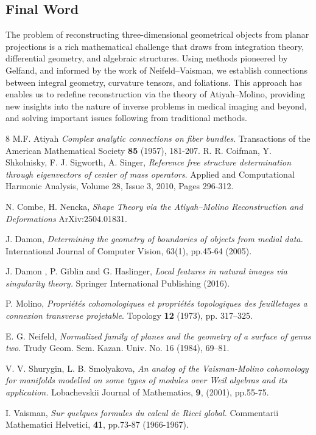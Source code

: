 \documentclass[runningheads]{llncs}
\begin{document}
\subsection{Final Word}
The problem of reconstructing three-dimensional geometrical objects from planar projections is a rich mathematical challenge that draws from integration theory, differential geometry, and algebraic structures. Using methods pioneered by Gelfand, and informed by the work of Neifeld--Vaisman, we establish connections between integral geometry, curvature tensors, and foliations. This approach has enables us to redefine reconstruction via the theory of Atiyah--Molino, providing new insights into the nature of inverse problems in medical imaging and beyond, and solving important issues following from traditional methods.   


%

{\small \begin{thebibliography}{8}
 M.F. Atiyah {\sl Complex analytic connections on fiber bundles}. Transactions of the American Mathematical Society {\bf 85} (1957), 181-207.
 R. R. Coifman, Y. Shkolnisky, F. J. Sigworth, A. Singer,
{\sl Reference free structure determination through eigenvectors of center of mass operators}.
Applied and Computational Harmonic Analysis,
Volume 28, Issue 3, 2010, Pages 296-312.


 N. Combe, H. Nencka, {\sl Shape Theory via the Atiyah--Molino Reconstruction and Deformations} ArXiv:2504.01831.  


 J. Damon, {\sl Determining the geometry of boundaries of objects from medial data. } International Journal of Computer Vision, 63(1), pp.45-64 (2005).

 J. Damon , P. Giblin and G. Haslinger, {\sl Local features in natural images via singularity theory.} Springer International Publishing (2016).

 P. Molino, {\sl Propriétés cohomologiques et propriétés topologiques des feuilletages a connexion transverse projetable}.
 Topology  {\bf 12} (1973), pp. 317--325.
 
  E. G. Neifeld, {\sl Normalized family of planes and the geometry of a surface of genus two.}
Trudy Geom. Sem. Kazan. Univ. No. 16 (1984), 69–81.

  V. V. Shurygin, L. B. Smolyakova, {\sl An analog of the Vaisman-Molino cohomology for manifolds modelled on some types of modules over Weil algebras and its application.} Lobachevskii Journal of Mathematics, {\bf 9},  (2001), pp.55-75. 

  I. Vaisman, {\sl Sur quelques formules du calcul de Ricci global.} Commentarii Mathematici Helvetici, {\bf 41}, pp.73-87 (1966-1967). 
\end{thebibliography}}
\end{document}
